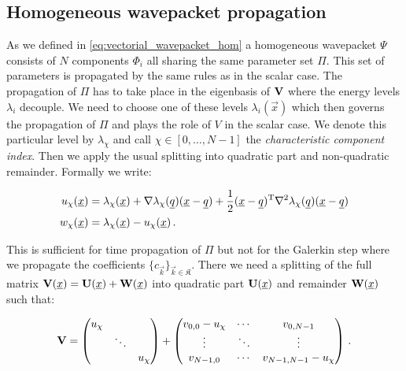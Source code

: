 \subsection{Homogeneous wavepacket propagation}


As we defined in \eqref{eq:vectorial_wavepacket_hom} a homogeneous wavepacket
$\Psi$ consists of $N$ components $\Phi_i$ all sharing the same parameter set
$\Pi$. This set of parameters is propagated by the same rules as in the scalar
case. The propagation of $\Pi$ has to take place in the eigenbasis of $\mathbf{V}$
where the energy levels $\lambda_i$ decouple. We need to choose one of these
levels $\lambda_i(\vec{x})$ which then governs the propagation of $\Pi$ and
plays the role of $V$ in the scalar case. We denote this particular level
by $\lambda_{\chi}$ and call $\chi \in [0, \ldots, N-1]$ the \emph{characteristic
component index}. Then we apply the usual splitting into quadratic part
and non-quadratic remainder. Formally we write:

\begin{align*}
  u_\chi(\underline{x}) & = \lambda_\chi(\underline{x}) + \nabla \lambda_\chi(\underline{q}) (\underline{x}-\underline{q})
                      + \frac{1}{2} (\underline{x}-\underline{q}){}^{\textnormal{T}} \nabla^2 \lambda_\chi(\underline{q}) (\underline{x}-\underline{q}) \\
  w_\chi(\underline{x}) & = \lambda_\chi(\underline{x}) - u_\chi(\underline{x}) \,.
\end{align*}

This is sufficient for time propagation of $\Pi$ but not for the Galerkin step
where we propagate the coefficients $\{c_{\vec{k}}\}_{\vec{k} \in \mathfrak{K}}$.
There we need a splitting of the full matrix $\mathbf{V}(\underline{x}) = \mathbf{U}(\underline{x}) + \mathbf{W}(\underline{x})$
into quadratic part $\mathbf{U}(\underline{x})$ and remainder $\mathbf{W}(\underline{x})$ such that:

\begin{equation*}
  \mathbf{V} =
  \begin{pmatrix}
    u_\chi & {}     & {} \\
    {}     & \ddots & {} \\
    {}     &        & u_\chi
  \end{pmatrix}
  +
    \begin{pmatrix}
    v_{0,0} - u_\chi & \cdots & v_{0,N-1} \\
    \vdots           & \ddots & \vdots \\
    v_{N-1,0}        & \cdots & v_{N-1,N-1} - u_\chi
  \end{pmatrix} \,.
\end{equation*}

